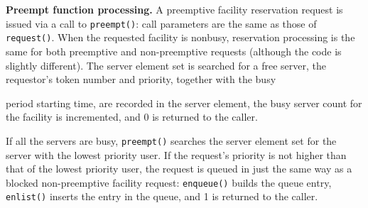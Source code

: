 \textbf{Preempt function processing.} A preemptive facility reservation request is
issued via a call to \texttt{preempt()}: call parameters are the same as those of
\texttt{request()}. When the requested facility is nonbusy, reservation processing
is the same for both preemptive and non-preemptive requests (although the
code is slightly different). The server element set is searched for a free
server, the requestor's token number and priority, together with the busy

\noindent period starting time, are recorded in the server element, the busy server count
for the facility is incremented, and 0 is returned to the caller.

If all the servers are busy, \texttt{preempt()} searches the server element set
for the server with the lowest priority user. If the request's priority is not
higher than that of the lowest priority user, the request is queued in just the
same way as a blocked non-preemptive facility request: \texttt{enqueue()} builds
the queue entry, \texttt{enlist()} inserts the entry in the queue, and 1 is returned to
the caller.

